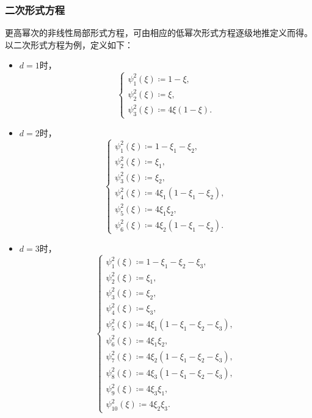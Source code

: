 \subsubsection{二次形式方程}
更高幂次的非线性局部形式方程，可由相应的低幂次形式方程逐级地推定义而得。以二次形式方程为例，定义如下：
\begin{itemize}
  \item $d=1$时，
  \begin{equation*}
    \begin{cases}
      \psi_{1}^{2}(\xi) \coloneqq 1 - \xi, \\
      \psi_{2}^{2}(\xi) \coloneqq \xi, \\
      \psi_{3}^{2}(\xi) \coloneqq 4 \xi \left( 1 - \xi \right).
    \end{cases}
  \end{equation*}
  \item $d=2$时，
  \begin{equation*}
    \begin{cases}
      \psi_{1}^{2}(\xi) \coloneqq 1 - \xi_{1} - \xi_{2}, \\
      \psi_{2}^{2}(\xi) \coloneqq \xi_{1}, \\
      \psi_{3}^{2}(\xi) \coloneqq \xi_{2}, \\
      \psi_{4}^{2}(\xi) \coloneqq 4 \xi_{1} \left( 1 - \xi_{1} - \xi_{2} \right), \\
      \psi_{5}^{2}(\xi) \coloneqq 4 \xi_{1} \xi_{2}, \\
      \psi_{6}^{2}(\xi) \coloneqq 4 \xi_{2} \left( 1 - \xi_{1} - \xi_{2} \right).
    \end{cases}
  \end{equation*}
  \item $d=3$时，
  \begin{equation*}
    \begin{cases}
      \psi_{1}^{2}(\xi) \coloneqq 1 - \xi_{1} - \xi_{2} - \xi_{3}, \\
      \psi_{2}^{2}(\xi) \coloneqq \xi_{1}, \\
      \psi_{3}^{2}(\xi) \coloneqq \xi_{2}, \\
      \psi_{4}^{2}(\xi) \coloneqq \xi_{3}, \\
      \psi_{5}^{2}(\xi) \coloneqq 4 \xi_{1} \left( 1 - \xi_{1} - \xi_{2} - \xi_{3} \right), \\
      \psi_{6}^{2}(\xi) \coloneqq 4 \xi_{1} \xi_{2}, \\
      \psi_{7}^{2}(\xi) \coloneqq 4 \xi_{2} \left( 1 - \xi_{1} - \xi_{2} - \xi_{3} \right), \\
      \psi_{8}^{2}(\xi) \coloneqq 4 \xi_{3} \left( 1 - \xi_{1} - \xi_{2} - \xi_{3} \right), \\
      \psi_{9}^{2}(\xi) \coloneqq 4 \xi_{3} \xi_{1}, \\
      \psi_{10}^{2}(\xi) \coloneqq 4 \xi_{2} \xi_{3}.
    \end{cases}
  \end{equation*}
\end{itemize}

